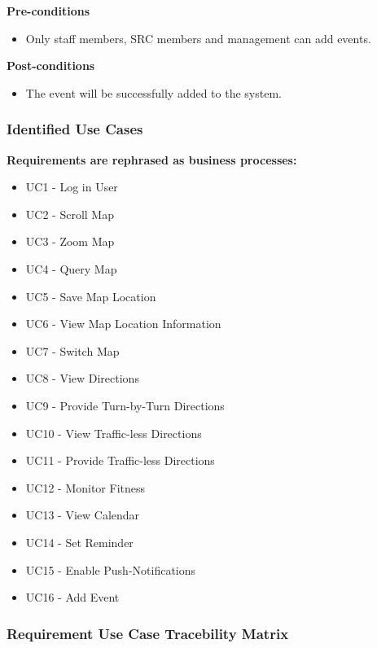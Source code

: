 \documentclass[runningheads,a4paper]{article}
\begin{document}
  
\textbf{Pre-conditions}
\begin{itemize}
	\item Only staff members, SRC members and management can add events.
\end{itemize}
  
\textbf{Post-conditions}
\begin{itemize}
  	\item The event will be successfully added to the system.
\end{itemize}

\subsubsection{Identified Use Cases}
\textbf{Requirements are rephrased as business processes:}
\begin{itemize}
	\item UC1 - Log in User
	\item UC2 - Scroll Map
	\item UC3 - Zoom Map
	\item UC4 - Query Map
	\item UC5 - Save Map Location
	\item UC6 - View Map Location Information
	\item UC7 - Switch Map
	\item UC8 - View Directions
	\item UC9 - Provide Turn-by-Turn Directions
	\item UC10 - View Traffic-less Directions
	\item UC11 - Provide Traffic-less Directions
	\item UC12 - Monitor Fitness
	\item UC13 - View Calendar
	\item UC14 - Set Reminder
	\item UC15 - Enable Push-Notifications
	\item UC16 - Add Event 
\end{itemize}

\pagebreak
\subsubsection{Requirement Use Case Tracebility Matrix}
\end{document}
